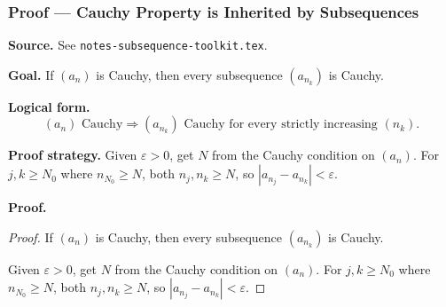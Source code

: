 
\clearpage
{}
\hypertarget{proof-RA-ABB-P-cauchy-inherited}{}

\subsubsection[Cauchy Property is Inherited by Subsequences]{Proof --- Cauchy Property is Inherited by Subsequences}

\bigskip

\noindent
\textbf{Source.}
See \texttt{notes-subsequence-toolkit.tex}.

\vspace{0.75em}

\noindent
\textbf{Goal.}
If $(a_n)$ is Cauchy, then every subsequence $(a_{n_k})$ is Cauchy.

\vspace{0.75em}

\noindent
\textbf{Logical form.}
\[
  (a_n) \text{ Cauchy} \Rightarrow (a_{n_k}) \text{ Cauchy for every strictly increasing } (n_k).
\]

\vspace{0.75em}

\noindent
\textbf{Proof strategy.}
Given $\varepsilon > 0$, get $N$ from the Cauchy condition on $(a_n)$. For $j, k \ge N_0$ where $n_{N_0} \ge N$, both $n_j, n_k \ge N$, so $|a_{n_j} - a_{n_k}| < \varepsilon$.

\vspace{0.75em}

\noindent
\textbf{Proof.}
\begin{proof}
\Claim If $(a_n)$ is Cauchy, then every subsequence $(a_{n_k})$ is Cauchy.

\Given 

\Goal 

\Strategy Given $\varepsilon > 0$, get $N$ from the Cauchy condition on $(a_n)$. For $j, k \ge N_0$ where $n_{N_0} \ge N$, both $n_j, n_k \ge N$, so $|a_{n_j} - a_{n_k}| < \varepsilon$.

\medskip


\end{proof}

